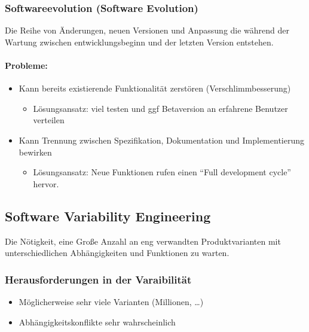\documentclass[ngerman,color=3b]{tuda_summary}
\begin{document}
\subsubsection{Softwareevolution (Software Evolution)}
\begin{definition}[Softwareevolution]
    Die Reihe von Änderungen, neuen Versionen und Anpassung die während der Wartung zwischen entwicklungsbeginn und der letzten Version entstehen.
\end{definition}
\paragraph{Probleme:}\begin{itemize}
    \item Kann bereits existierende Funktionalität zerstören (Verschlimmbesserung)\begin{itemize}
              \item Lösungsansatz: viel testen und ggf Betaversion an erfahrene Benutzer verteilen
          \end{itemize}
    \item Kann Trennung zwischen Spezifikation, Dokumentation und Implementierung bewirken\begin{itemize}
              \item Lösungsansatz: Neue Funktionen rufen einen \enquote{Full development cycle} hervor.
          \end{itemize}
\end{itemize}
\subsection{Software Variability Engineering}
\begin{definition}
    Die Nötigkeit, eine Große Anzahl an eng verwandten Produktvarianten mit unterschiedlichen Abhängigkeiten und Funktionen zu warten.
\end{definition}

\subsubsection{Herausforderungen in der Varaibilität}\begin{itemize}
    \item Möglicherweise sehr viele Varianten (Millionen, \dots)
    \item Abhängigkeitskonflikte sehr wahrscheinlich
\end{itemize}
\end{document}
